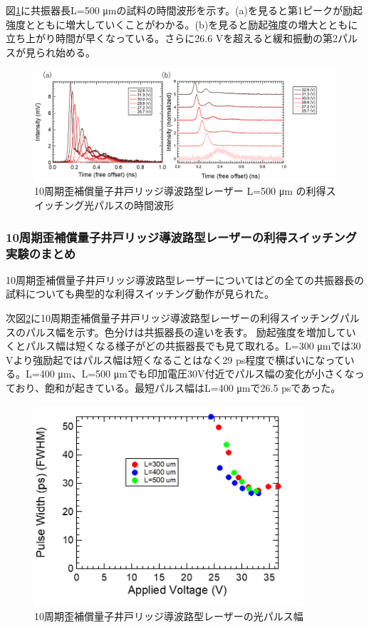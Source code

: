 {%
図\ref{fig:fig_3_2_10QW_ridge_L500_GS}に共振器長L=500 \si{\micro\metre}の試料の時間波形を示す。(a)を見ると第1ピークが励起強度とともに増大していくことがわかる。(b)を見ると励起強度の増大とともに立ち上がり時間が早くなっている。さらに26.6 Vを超えると緩和振動の第2パルスが見られ始める。
\begin{figure}[h]
	\centering
	\includegraphics[width=15cm]{figure/fig_3_2_10QW_ridge_L500_GS.png}
		\caption{10周期歪補償量子井戸リッジ導波路型レーザー L=500 \si{\micro\metre} の利得スイッチング光パルスの時間波形}
		\label{fig:fig_3_2_10QW_ridge_L500_GS}
\end{figure}

\newpage
\subsubsection{10周期歪補償量子井戸リッジ導波路型レーザーの利得スイッチング実験のまとめ}
10周期歪補償量子井戸リッジ導波路型レーザーについてはどの全ての共振器長の試料についても典型的な利得スイッチング動作が見られた。


次図\ref{fig:fig_3_2_10QW_ridge_GS_FWHM}に10周期歪補償量子井戸リッジ導波路型レーザーの利得スイッチングパルスのパルス幅を示す。色分けは共振器長の違いを表す。
励起強度を増加していくとパルス幅は短くなる様子がどの共振器長でも見て取れる。L=300 \si{\micro\metre}では30 Vより強励起ではパルス幅は短くなることはなく29 ps程度で横ばいになっている。L=400 \si{\micro\metre}、L=500 \si{\micro\metre}でも印加電圧30V付近でパルス幅の変化が小さくなっており、飽和が起きている。最短パルス幅はL=400 \si{\micro\metre}で26.5 psであった。
\begin{figure}[h]
	\centering
	\includegraphics[width=10cm]{figure/fig_3_2_10QW_ridge_GS_FWHM.png}
		\caption{10周期歪補償量子井戸リッジ導波路型レーザーの光パルス幅}
		\label{fig:fig_3_2_10QW_ridge_GS_FWHM}
\end{figure}

}
